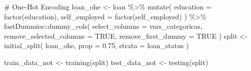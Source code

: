 \documentclass[
  letterpaper,
  DIV=11,
  numbers=noendperiod]{scrartcl}
\newenvironment{Shaded}{\begin{snugshade}}{\end{snugshade}}
\newcommand{\AttributeTok}[1]{\textcolor[rgb]{0.40,0.45,0.13}{#1}}
\newcommand{\CommentTok}[1]{\textcolor[rgb]{0.37,0.37,0.37}{#1}}
\newcommand{\ConstantTok}[1]{\textcolor[rgb]{0.56,0.35,0.01}{#1}}
\newcommand{\DecValTok}[1]{\textcolor[rgb]{0.68,0.00,0.00}{#1}}
\newcommand{\FloatTok}[1]{\textcolor[rgb]{0.68,0.00,0.00}{#1}}
\newcommand{\FunctionTok}[1]{\textcolor[rgb]{0.28,0.35,0.67}{#1}}
\newcommand{\NormalTok}[1]{\textcolor[rgb]{0.00,0.23,0.31}{#1}}
\newcommand{\OtherTok}[1]{\textcolor[rgb]{0.00,0.23,0.31}{#1}}
\newcommand{\SpecialCharTok}[1]{\textcolor[rgb]{0.37,0.37,0.37}{#1}}
\newcommand{\StringTok}[1]{\textcolor[rgb]{0.13,0.47,0.30}{#1}}
\begin{document}
\begin{Shaded}
\end{Shaded}

\begin{Shaded}
\begin{Highlighting}[]
\CommentTok{\# One{-}Hot Encoding}
\NormalTok{loan\_ohe }\OtherTok{\textless{}{-}}\NormalTok{ loan }\SpecialCharTok{\%\textgreater{}\%}
  \FunctionTok{mutate}\NormalTok{(}
    \AttributeTok{education =} \FunctionTok{factor}\NormalTok{(education),}
    \AttributeTok{self\_employed =} \FunctionTok{factor}\NormalTok{(self\_employed)}
\NormalTok{  ) }\SpecialCharTok{\%\textgreater{}\%}
\NormalTok{  fastDummies}\SpecialCharTok{::}\FunctionTok{dummy\_cols}\NormalTok{(}
    \AttributeTok{select\_columns =}\NormalTok{ vars\_categoricas,}
    \AttributeTok{remove\_selected\_columns =} \ConstantTok{TRUE}\NormalTok{,}
    \AttributeTok{remove\_first\_dummy =} \ConstantTok{TRUE}
\NormalTok{  )}
\NormalTok{split }\OtherTok{\textless{}{-}} \FunctionTok{initial\_split}\NormalTok{(}
\NormalTok{  loan\_ohe,}
  \AttributeTok{prop   =} \FloatTok{0.75}\NormalTok{,}
  \AttributeTok{strata =}\NormalTok{ loan\_status}
\NormalTok{)}

\NormalTok{train\_data\_not }\OtherTok{\textless{}{-}} \FunctionTok{training}\NormalTok{(split)}
\NormalTok{test\_data\_not  }\OtherTok{\textless{}{-}} \FunctionTok{testing}\NormalTok{(split)}
\end{Highlighting}
\end{Shaded}
\end{document}
